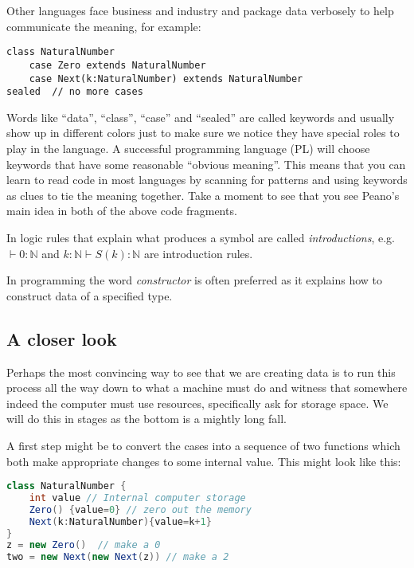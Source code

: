Other languages face business and industry and package data 
verbosely to help communicate the meaning, for example:
\begin{center}
\begin{lstlisting}[language=Sava]
class NaturalNumber
    case Zero extends NaturalNumber
    case Next(k:NaturalNumber) extends NaturalNumber
sealed  // no more cases
\end{lstlisting}
\end{center}
Words like ``data'', ``class'', ``case'' and ``sealed'' are 
called keywords and usually show up in different colors just to make 
sure we notice they have special roles to play in the language.
A successful programming language (PL) will choose keywords 
that have some reasonable ``obvious meaning''.  This means that you 
can learn to read code in most languages by scanning for patterns 
and using keywords as clues to tie the meaning together.  Take 
a moment to see that you see Peano's main idea in both of the above 
code fragments.

\begin{definition}
    In logic rules that explain what produces a symbol are called 
    \emph{introductions}, e.g.\ $\vdash 0:\mathbb{N}$ and 
    $k:\mathbb{N}\vdash S(k):\mathbb{N}$ are introduction rules.
    
    In programming the word \emph{constructor} is often preferred
    as it explains how to construct data of a specified type.        
\end{definition}

\subsection{A closer look}
Perhaps the most convincing way to see that we are creating 
data is to run this process all the way down to what a machine 
must do and witness that somewhere indeed the computer must use 
resources, specifically ask for storage space.  We will do this 
in stages as the bottom is a mightly long fall.

A first step might be to convert the cases into a sequence 
of two functions which both make appropriate changes to 
some internal value.  This might look like this:
\begin{center}
\begin{lstlisting}[language=Java]
class NaturalNumber {
    int value // Internal computer storage
    Zero() {value=0} // zero out the memory
    Next(k:NaturalNumber){value=k+1}
}
z = new Zero()  // make a 0
two = new Next(new Next(z)) // make a 2
\end{lstlisting}
\end{center}

